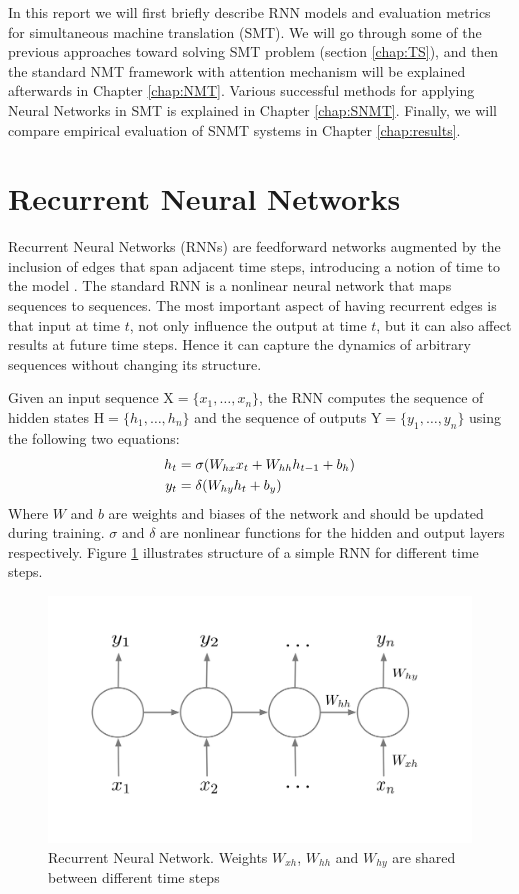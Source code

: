 \documentclass{sfuthesis}
\begin{document}
In this report we will first briefly describe RNN models and evaluation metrics for simultaneous machine translation (SMT). We will go through some of the previous approaches toward solving SMT problem (section \ref{chap:TS}), and then the standard NMT framework with attention mechanism will be explained afterwards in Chapter \ref{chap:NMT}. Various successful methods for applying Neural Networks in SMT is explained in Chapter \ref{chap:SNMT}. Finally, we will compare empirical evaluation of SNMT systems in Chapter \ref{chap:results}.
\section{Recurrent Neural Networks} \label{sec:RNN}

Recurrent Neural Networks (RNNs) are feedforward networks augmented by the inclusion of edges that span adjacent time steps, introducing a notion of time to the model \cite{zachary:2015:arxive}. The standard RNN is a nonlinear neural network that maps sequences to sequences. The most important aspect of having recurrent edges is that input at time $t$, not only influence the output at time $t$, but it can also affect results at future time steps. Hence it can capture the dynamics of arbitrary sequences without changing its structure.

Given an input sequence $\text{X} = \{ x_1, \dots, x_n \}$, the RNN computes the sequence of hidden states $\text{H} = \{ h_1, \dots, h_n \}$ and the sequence of outputs $\text{Y} = \{ y_1, \dots, y_n \}$ using the following two equations:
\begin{align*}
\centering
h_t &= \sigma (W_{hx} x_t + W_{hh} h_{t-1} + b_h)\\
y_t &= \delta (W_{hy} h_t + b_y)
\end{align*}
Where $W$ and $b$ are weights and biases of the network and should be updated during training. $\sigma$ and $\delta$ are nonlinear functions for the hidden and output layers respectively. Figure \ref{fig:RNN0} illustrates structure of a simple RNN for different time steps.

\begin{figure}[t]
\centering
\includegraphics[scale=0.15]{./images/RNN}
\caption[Recurrent Neural Network]{Recurrent Neural Network. Weights $W_{xh}$, $W_{hh}$ and $W_{hy}$ are shared between different time steps}
\label{fig:RNN0}
\end{figure}
\end{document}
